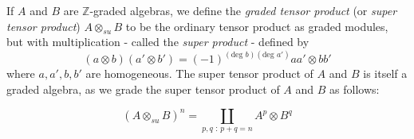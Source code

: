 \documentclass[12pt]{article}
\begin{document}
If $A$ and $B$ are $\mathbb{Z}$-graded algebras, we define the \emph{graded tensor product} (or \emph{super tensor product}) $A \otimes_{su} B$ to be the ordinary tensor product as graded modules, but with multiplication - called the {\em super product} - defined by
$$(a \otimes b)(a' \otimes b') = (-1)^{(\text{deg \ } b)(\text{deg \ } a')}aa' \otimes bb'$$
where $a,a',b,b'$ are homogeneous. The super tensor product of $A$ and $B$ is itself a graded algebra, as we grade the super tensor product of $A$ and $B$ as follows:

$$ (A \otimes_{su} B)^n = \coprod_{p,q \text{ : } p + q = n} A^p \otimes B^q $$
\end{document}
